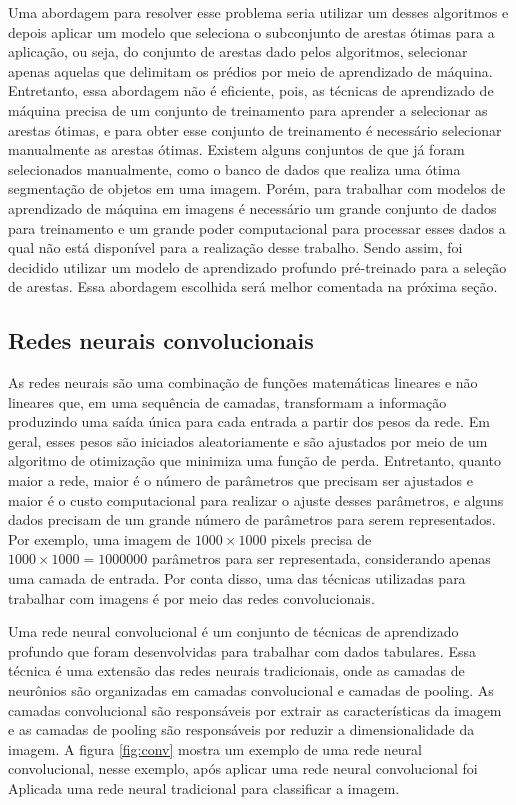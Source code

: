\documentclass[12pt]{article}
\begin{document}
Uma abordagem para resolver esse problema seria utilizar um desses algoritmos e depois aplicar um modelo que seleciona o subconjunto de arestas ótimas para a aplicação, ou seja, do conjunto de arestas dado pelos algoritmos, selecionar apenas aquelas que delimitam os prédios por meio de aprendizado de máquina. Entretanto, essa abordagem não é eficiente, pois, as técnicas de aprendizado de máquina precisa de um conjunto de treinamento para aprender a selecionar as arestas ótimas, e para obter esse conjunto de treinamento é necessário selecionar manualmente as arestas ótimas. Existem alguns conjuntos de que já foram selecionados manualmente, como o banco de dados \cite[Nyu Dataset]{nyu_depth_v2} que realiza uma ótima segmentação de objetos em uma imagem. Porém, para trabalhar com modelos de aprendizado de máquina em imagens é necessário um grande conjunto de dados para treinamento e um grande poder computacional para processar esses dados a qual não está disponível para a realização desse trabalho. Sendo assim, foi decidido utilizar um modelo de aprendizado profundo pré-treinado para a seleção de arestas. Essa abordagem escolhida será melhor comentada na próxima seção.

\subsection{Redes neurais convolucionais}

As redes neurais \cite{bishop2016pattern} são uma combinação de funções matemáticas lineares e não lineares que, em uma sequência de camadas, transformam a informação produzindo uma saída única para cada entrada a partir dos pesos da rede. Em geral, esses pesos são iniciados aleatoriamente e são ajustados por meio de um algoritmo de otimização que minimiza uma função de perda. Entretanto, quanto maior a rede, maior é o número de parâmetros que precisam ser ajustados e maior é o custo computacional para realizar o ajuste desses parâmetros, e alguns dados precisam de um grande número de parâmetros para serem representados. Por exemplo, uma imagem de $1000\times1000$ pixels precisa de $1000\times1000=1000000$ parâmetros para ser representada, considerando apenas uma camada de entrada. Por conta disso, uma das técnicas utilizadas para trabalhar com imagens é por meio das redes convolucionais.

Uma rede neural convolucional \cite{Goodfellow-et-al-2016} é um conjunto de técnicas de aprendizado profundo que foram desenvolvidas para trabalhar com dados tabulares. Essa técnica é uma extensão das redes neurais tradicionais, onde as camadas de neurônios são organizadas em camadas convolucional e camadas de pooling. As camadas convolucional são responsáveis por extrair as características da imagem e as camadas de pooling são responsáveis por reduzir a dimensionalidade da imagem. A figura \ref{fig:conv} mostra um exemplo de uma rede neural convolucional, nesse exemplo, após aplicar uma rede neural convolucional foi Aplicada uma rede neural tradicional para classificar a imagem.
\end{document}

